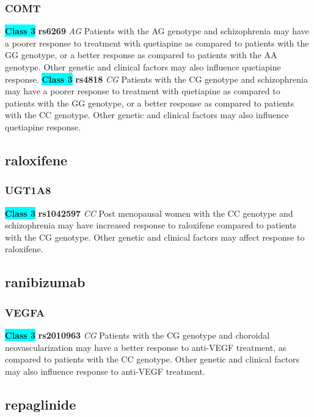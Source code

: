 \documentclass{book}
\begin{document}
\subsubsection{ COMT }

\begin{center}
\textbf{\colorbox{cyan} {Class 3}} \textbf{ rs6269 } \textit{ AG }
Patients with the AG genotype and schizophrenia may have a poorer response to treatment with quetiapine as compared to patients with the GG genotype, or a better response as compared to patients with the AA genotype. Other genetic and clinical factors may also influence quetiapine response. \textbf{\colorbox{cyan} {Class 3}} \textbf{ rs4818 } \textit{ CG }
Patients with the CG genotype and schizophrenia may have a poorer response to treatment with quetiapine as compared to patients with the GG genotype, or a better response as compared to patients with the CC genotype. Other genetic and clinical factors may also influence quetiapine response. 


\end{center}\subsection{ raloxifene }


\subsubsection{ UGT1A8 }

\begin{center}
\textbf{\colorbox{cyan} {Class 3}} \textbf{ rs1042597 } \textit{ CC }
Post menopausal women with the CC genotype and schizophrenia may have increased response to raloxifene compared to patients with the CG genotype. Other genetic and clinical factors may affect response to raloxifene. 


\end{center}\subsection{ ranibizumab }


\subsubsection{ VEGFA }

\begin{center}
\textbf{\colorbox{cyan} {Class 3}} \textbf{ rs2010963 } \textit{ CG }
Patients with the CG genotype and choroidal neovascularization may have a better response to anti-VEGF treatment, as compared to patients with the CC genotype. Other genetic and clinical factors may also influence response to anti-VEGF treatment. 


\end{center}\subsection{ repaglinide }
\end{document}
